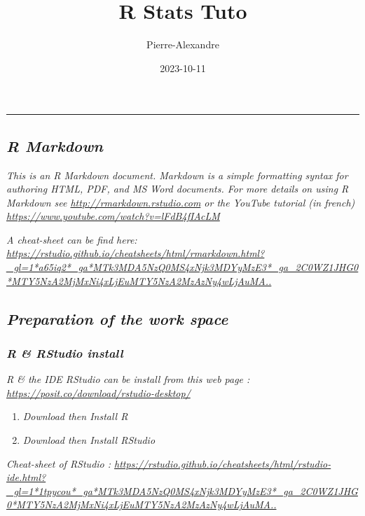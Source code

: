 \documentclass[
]{article}
\title{R Stats Tuto}
\author{Pierre-Alexandre}
\date{2023-10-11}
\providecommand{\tightlist}{%
  \setlength{\itemsep}{0pt}\setlength{\parskip}{0pt}}
\begin{document}
\maketitle

\begin{center}\rule{0.5\linewidth}{0.5pt}\end{center}

\hypertarget{r-markdown}{%
\subsection{\texorpdfstring{\emph{R
Markdown}}{R Markdown}}\label{r-markdown}}

\emph{This is an R Markdown document. Markdown is a simple formatting
syntax for authoring HTML, PDF, and MS Word documents. For more details
on using R Markdown see \url{http://rmarkdown.rstudio.com} or the
YouTube tutorial (in french)
\url{https://www.youtube.com/watch?v=lFdB4fIAcLM}}

\emph{A cheat-sheet can be find here:
\url{https://rstudio.github.io/cheatsheets/html/rmarkdown.html?_gl=1*a65iq2*_ga*MTk3MDA5NzQ0MS4xNjk3MDYyMzE3*_ga_2C0WZ1JHG0*MTY5NzA2MjMxNi4xLjEuMTY5NzA2MzAzNy4wLjAuMA..}}

\hypertarget{preparation-of-the-work-space}{%
\subsection{\texorpdfstring{\emph{Preparation of the work
space}}{Preparation of the work space}}\label{preparation-of-the-work-space}}

\hypertarget{r-rstudio-install}{%
\subsubsection{\texorpdfstring{\emph{R \& RStudio
install}}{R \& RStudio install}}\label{r-rstudio-install}}

\emph{R \& the IDE RStudio can be install from this web page :
\url{https://posit.co/download/rstudio-desktop/}}

\begin{enumerate}
\def\labelenumi{\arabic{enumi}.}
\tightlist
\item
  \emph{Download then Install R}
\item
  \emph{Download then Install RStudio}
\end{enumerate}

\emph{Cheat-sheet of RStudio :
\url{https://rstudio.github.io/cheatsheets/html/rstudio-ide.html?_gl=1*1tpycou*_ga*MTk3MDA5NzQ0MS4xNjk3MDYyMzE3*_ga_2C0WZ1JHG0*MTY5NzA2MjMxNi4xLjEuMTY5NzA2MzAzNy4wLjAuMA..}}
\end{document}

